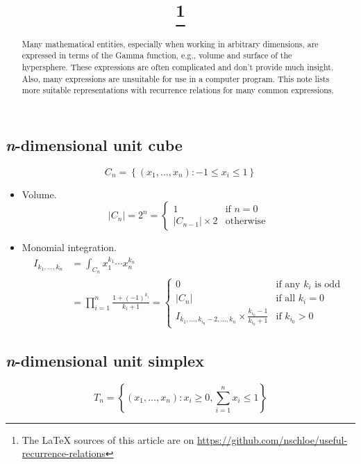 \documentclass[draft]{scrartcl}
\title{\mytitle\footnote{The LaTeX sources of this article are on
\url{https://github.com/nschloe/useful-recurrence-relations}}}
\author{\myauthor}
\begin{document}
\maketitle
\begin{abstract}
  Many mathematical entities, especially when working in arbitrary dimensions, are
  expressed in terms of the Gamma function, e.g., volume and surface of the hypersphere.
  These expressions are often complicated and don't provide much insight. Also, many
  expressions are unsuitable for use in a computer program. This note lists more
  suitable representations with recurrence relations for many common expressions.
\end{abstract}

\subsection*{\textit{n}-dimensional unit cube}
\[
  C_n = \left\{(x_1,\dots,x_n): -1 \le x_i \le 1\right\}
\]

\begin{itemize}
  \item Volume.
    \begin{equation}
      |C_n| = 2^n = \begin{cases}
        1&\text{if $n=0$}\\
        |C_{n-1}| \times 2&\text{otherwise}
      \end{cases}
    \end{equation}
  \item Monomial integration.
  \begin{equation}
    \begin{split}
    I_{k_1,\dots,k_n}
    &= \int_{C_n} x_1^{k_1}\cdots x_n^{k_n}\\
      &= \prod_{i=1}^n \frac{1 + (-1)^{k_i}}{k_i+1}
    =\begin{cases}
      0&\text{if any $k_i$ is odd}\\
      |C_n|&\text{if all $k_i=0$}\\
      I_{k_1,\dots,k_{i_0}-2,\dots,k_n} \times \frac{k_{i_0}-1}{k_{i_0}+1}&\text{if $k_{i_0} > 0$}
    \end{cases}
  \end{split}
  \end{equation}
\end{itemize}

\subsection*{\textit{n}-dimensional unit simplex}
\[
  T_n = \left\{(x_1,\dots,x_n):x_i \geq 0, \sum_{i=1}^n x_i \leq 1\right\}
\]
\end{document}
